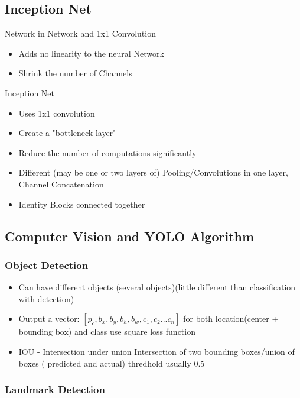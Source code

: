 \documentclass[11pt, openany]{book}              %
\begin{document}
\subsection{Inception Net}

Network in Network and 1x1 Convolution

\begin{itemize}
	\item Adds no linearity to the neural Network
	\item Shrink the number of Channels
\end{itemize}

Inception Net

\begin{itemize}
	\item Uses 1x1 convolution
	\item Create a "bottleneck layer"
	\item Reduce the number of computations significantly
	\item Different (may be one or two layers of) Pooling/Convolutions in one layer, Channel Concatenation
	\item Identity Blocks connected together
\end{itemize}

\subsection{Computer Vision and YOLO Algorithm}

\subsubsection{Object Detection}

\begin{itemize}
\item Can have different objects (several objects)(little different than classification with detection)
\item Output a vector: $[p_c, b_x,b_y,b_h,b_w, c_1,c_2...c_n]$ for both location(center + bounding box) and class
	\subitem use square loss function
\item IOU - Intersection under union
	\subitem Intersection of two bounding boxes/union of boxes ( predicted and actual) 
	\subitem thredhold usually 0.5
\end{itemize}

\subsubsection{Landmark Detection}
\end{document}
